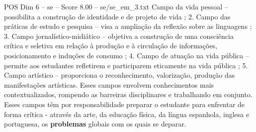 \begin{textsample}{POS Dim 6 – se – Score 8.00 – se/se\_em\_3.txt}
Campo da vida pessoal – possibilita a construção de identidade e de projeto de vida ; 2.
Campo das práticas de estudo e pesquisa – visa a ampliação da reflexão sobre as linguagens ; 3.
Campo jornalístico-midiático – objetiva a construção de uma consciência crítica e seletiva em relação à produção e à circulação de informações, posicionamento e induções de consumo ; 4.
Campo de atuação na vida pública – permite aos estudantes refletirem e participarem eticamente na vida pública ; 5.
Campo artístico – proporciona o reconhecimento, valorização, produção das manifestações artísticas.
Esses campos envolvem conhecimentos mais contextualizados, rompendo as barreiras disciplinares e trabalhando em conjunto.
Esses campos têm por responsabilidade preparar o estudante para enfrentar de forma crítica - através da arte, da educação física, da língua espanhola, inglesa e portuguesa, os \textbf{problemas} globais com os quais se deparar.

\end{textsample}
